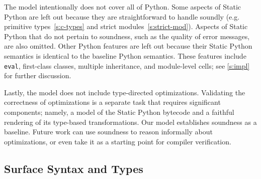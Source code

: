 \documentclass[english,cleveref,submission]{programming}
\newcommand{\SP}{Static Python}
\newcommand{\code}[1]{\texttt{#1}}
\begin{document}
The model intentionally does not cover all of Python.
Some aspects of \SP{} are left out because they are straightforward to
handle soundly (e.g. primitive types~\cref{s:c-types} and strict modules~\cref{s:strict-mod}).
Aspects of \SP{} that do not pertain to soundness, such as the quality of error messages,
are also omitted.
Other Python features are left out because their \SP{} semantics is identical
to the baseline Python semantics.
These features include \code{eval}, first-class classes, multiple inheritance, and module-level cells;
see \cref{s:impl} for further discussion.

Lastly, the model does not include type-directed optimizations.
Validating the correctness of optimizations is a separate task that requires
significant components; namely, a model of the \SP{} bytecode and a faithful
rendering of its type-based transformations.
Our model establishes soundness as a baseline.
Future work can use soundness to reason informally about optimizations,
or even take it as a starting point for compiler verification.


\subsection{Surface Syntax and Types}
\end{document}
